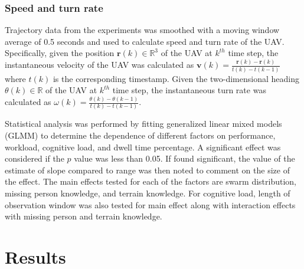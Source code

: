 \documentclass{article}
\begin{document}
\subsubsection{Speed and turn rate}
Trajectory data from the experiments was smoothed with a moving window average of 0.5 seconds and used to calculate speed and turn rate of the UAV. Specifically, given the position $\mathbf{r}(k) \in \mathbb{R}^3$ of the UAV at $k^{th}$ time step, the instantaneous velocity of the UAV was calculated as $\mathbf{v}(k) =\frac{\mathbf{r}(k)-\mathbf{r}(k)}{t(k)-t(k-1)}$ where $t(k)$ is the corresponding timestamp. Given the two-dimensional heading $\theta(k) \in\mathbb{R}$ of the UAV at $k^{th}$ time step, the instantaneous turn rate was calculated as $\omega(k) =\frac{\theta(k)-\theta(k-1)}{t(k)-t(k-1)}$.
	
Statistical analysis was performed by fitting generalized linear mixed models (GLMM) to determine the dependence of different factors on performance, workload, cognitive load, and dwell time percentage. A significant effect was considered if the $p$ value was less than 0.05. If found significant, the value of the estimate of slope compared to range was then noted to comment on the size of the effect. The main effects tested for each of the factors are swarm distribution, missing person knowledge, and terrain knowledge. For cognitive load, length of observation window was also tested for main effect along with interaction effects with missing person and terrain knowledge. 
\clearpage
\section{Results} \label{sec:results}
	
\end{document}
